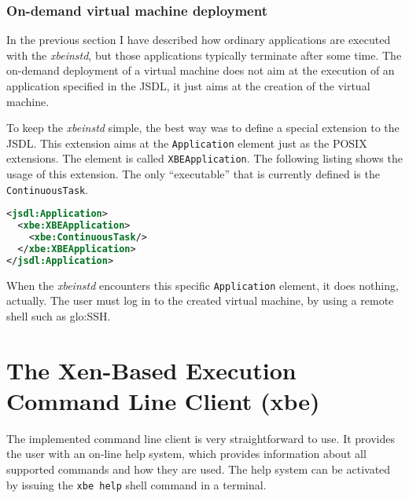 \subsubsection{On-demand virtual machine deployment}

In the  previous section  I have described  how ordinary  applications are
executed  with  the  \emph{xbeinstd},  but  those  applications  typically
terminate after some  time. The on-demand deployment of  a virtual machine
does not aim at the execution  of an application specified in the JSDL, it
just aims at the creation of the virtual machine.

To keep the  \emph{xbeinstd} simple, the best way was  to define a special
extension to  the JSDL.  This  extension aims at  the \texttt{Application}
element   just  as   the  POSIX   extensions.   The   element   is  called
\texttt{XBEApplication}.  The  following listing  shows the usage  of this
extension.  The  only ``executable''  that  is  currently  defined is  the
\texttt{ContinuousTask}.

\bigskip

\begin{center}
  \begin{minipage}{.75\textwidth}
    \begin{lstlisting}[captionpos=b,backgroundcolor=\color{listingcolor},frame=lines,numbers=none,stepnumber=5,numberfirstline=false,numberstyle=\tiny,caption={Example
        of a \texttt{ContinuousTask} used for on-demand virtual machine deployment.},label={lst:xbe-xbeinstd-continuous-task},language=XML]
<jsdl:Application>
  <xbe:XBEApplication>
    <xbe:ContinuousTask/>
  </xbe:XBEApplication>
</jsdl:Application>
    \end{lstlisting}
  \end{minipage}
\end{center}

When  the \emph{xbeinstd}  encounters  this specific  \texttt{Application}
element, it does  nothing, actually.  The user must log  in to the created
virtual machine, \eg by using a remote shell such as \gls{glo:SSH}.

\section[The Xen-Based Execution Command Line Client]{The Xen-Based Execution
  Command Line Client (xbe)}
\label{sec:command-line-client}

The implemented  command line  client is very  straightforward to  use. It
provides the user with an  on-line help system, which provides information
about all supported commands and how they are used. The help system can be
activated by issuing the \texttt{xbe help} shell command in a terminal.

